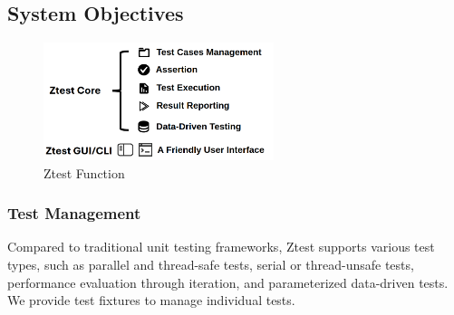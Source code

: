\documentclass{article}
\begin{document}
\subsection{System Objectives}
\begin{figure}[H]
    \centering
    \includegraphics[width=0.6\textwidth]{img/func.png} %
    \caption{Ztest Function}
    \label{fig:ztest function }
\end{figure}
\subsubsection{Test Management}


Compared to traditional unit testing frameworks, Ztest supports various test types, such as parallel and thread-safe tests, serial or thread-unsafe tests, performance evaluation through iteration, and parameterized data-driven tests. We provide test fixtures to manage individual tests.
\end{document}
